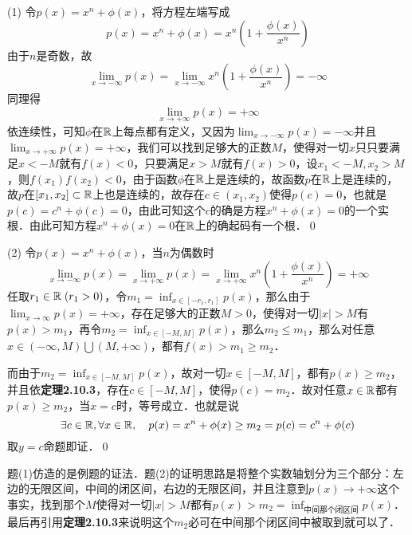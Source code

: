 (1) \prove 令$p(x)=x^n + \phi (x)$，将方程左端写成
\begin{equation}
    p(x) = x^n + \phi(x) = x^n (1 + \frac{\phi(x)}{x^n})
\end{equation}
由于$n$是奇数，故
\begin{equation}
    \lim_{x \to -\infty} p(x) = \lim_{x \to -\infty} x^n(1+\frac{\phi(x)}{x^n}) = -\infty
\end{equation}
同理得
\begin{equation}
    \lim_{x \to +\infty} p(x) = +\infty
\end{equation}
依连续性，可知$\phi$在$\mathbb{R}$上每点都有定义，又因为$\displaystyle\lim_{x \to -\infty} p(x) = -\infty$并且$\displaystyle\lim_{x \to +\infty} p(x) = +\infty$，我们可以找到足够大的正数$M$，使得对一切$x$只只要满足$x < -M$就有$f(x) < 0$，只要满足$x > M$就有$f(x) > 0$，设$x_1 < -M, x_2 > M$，则$f(x_1)f(x_2) < 0$，由于函数$\phi$在$\mathbb{R}$上是连续的，故函数$p$在$\mathbb{R}$上是连续的，故$p$在$[x_1, x_2] \subset \mathbb{R}$上也是连续的，故存在$c \in (x_1, x_2)$使得$p(c) = 0$，也就是$p(c) = c^n + \phi(c) = 0$，由此可知这个$c$的确是方程$x^n+\phi(x)=0$的一个实根．由此可知方程$x^n+\phi(x)=0$在$\mathbb{R}$上的确起码有一个根．\qed\bigskip

(2) \prove 令$p(x) = x^n + \phi(x)$，当$n$为偶数时
\begin{equation}
    \lim_{x \to -\infty} p(x) = \lim_{x \to +\infty} p(x) = \lim_{x \to +\infty} x^n(1+\frac{\phi(x)}{x^n}) = +\infty
\end{equation}
任取$r_1 \in \mathbb{R} \; (r_1 > 0)$，令$m_1 = \displaystyle\inf_{x \in [-r_1, r_1]} p(x)$，那么由于$\displaystyle\lim_{x \to \infty} p(x) = +\infty$，存在足够大的正数$M > 0$，使得对一切$\lvert x \rvert > M$有$p(x) > m_1$，再令$m_2 = \displaystyle\inf_{x \in [-M, M]} p(x)$，那么$m_2 \leq m_1$，那么对任意$x \in (-\infty, M) \bigcup (M, +\infty)$，都有$f(x) > m_1 \geq m_2$．

而由于$m_2 = \displaystyle\inf_{x \in [-M,M]} p(x)$，故对一切$x \in [-M, M]$，都有$p(x) \geq m_2$，并且依\textbf{定理2.10.3}，存在$c \in [-M, M]$，使得$p(c) = m_2$．故对任意$x \in \mathbb{R}$都有$p(x) \geq m_2$，当$x = c$时，等号成立．也就是说
\begin{equation}
    \exists c \in \mathbb{R}, \forall x \in \mathbb{R}, \quad p(x) = x^n + \phi(x) \geq m_2 = p(c) = c^n + \phi(c) 
\end{equation}
取$y=c$命题即证．\qed\bigskip

\annotate 题(1)仿造的是例题的证法．题(2)的证明思路是将整个实数轴划分为三个部分：左边的无限区间，中间的闭区间，右边的无限区间，并且注意到$p(x) \to +\infty$这个事实，找到那个$M$使得对一切$\lvert x \rvert > M$都有$p(x) > m_2= \displaystyle\inf_{\text{中间那个闭区间}} p(x)$．最后再引用\textbf{定理2.10.3}来说明这个$m_2$必可在中间那个闭区间中被取到就可以了．\bigskip

